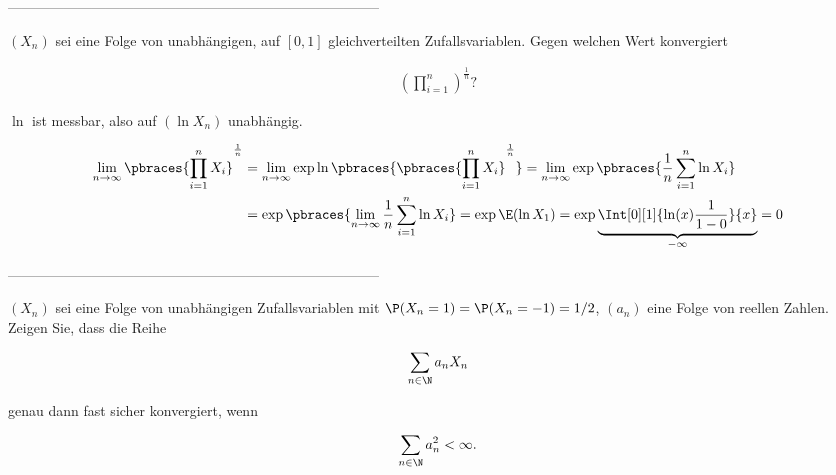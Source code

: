--------------------------------------------------------------------------------

\begin{exercise}

$(X_n)$ sei eine Folge von unabhängigen, auf $[0, 1]$ gleichverteilten Zufallsvariablen. Gegen welchen Wert konvergiert

\begin{align*}
  (\prod_{i=1}^n)^\frac{1}{n}?
\end{align*}

\end{exercise}

\begin{solution}

$\ln$ ist messbar, also auf $(\ln X_n)$ unabhängig.

\begin{align*}
  \lim_{n \to \infty}
  \pbraces{\prod_{i=1}^n X_i}^\frac{1}{n}
  & =
  \lim_{n \to \infty}
  \exp \ln \pbraces{\pbraces{\prod_{i=1}^n X_i}^\frac{1}{n}}
  =
  \lim_{n \to \infty}
  \exp \pbraces{\frac{1}{n} \sum_{i=1}^n \ln X_i} \\
  & =
  \exp \pbraces
  {\lim_{n \to \infty} \frac{1}{n} \sum_{i=1}^n \ln X_i}
  =
  \exp \E(\ln X_1)
  =
  \exp \underbrace{\Int[0][1]{\ln(x) \frac{1}{1-0}}{x}}_{-\infty} = 0
\end{align*}

\end{solution}

--------------------------------------------------------------------------------

\begin{exercise}

$(X_n)$ sei eine Folge von unabhängigen Zufallsvariablen mit $\P(X_n = 1) = \P(X_n = -1) = 1/2$, $(a_n)$ eine Folge von reellen Zahlen. Zeigen Sie, dass die Reihe

\begin{align*}
  \sum_{n \in \N} a_n X_n
\end{align*}

genau dann fast sicher konvergiert, wenn

\begin{align*}
  \sum_{n \in \N} a_n^2 < \infty.
\end{align*}

\end{exercise}

